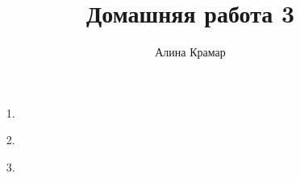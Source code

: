 \documentclass{article}
\begin{document}
\title{Домашняя работа 3}
\author{Алина Крамар}

\maketitle
\begin{enumerate}

\item[1.]
\item[2.]
\item[3.]

\end{enumerate}
\end{document}
